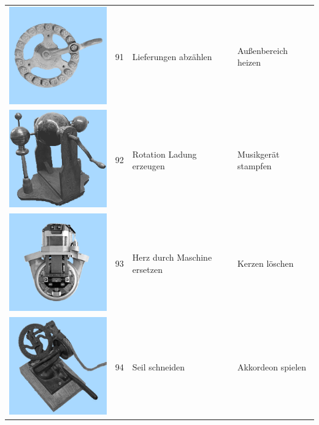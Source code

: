 \documentclass[
  english,
  man,floatsintext]{apa7}
\begin{document}
\begin{center}
\begin{ThreePartTable}
\begin{longtable}{llll}
\includegraphics[valign=c, scale=0.19]{../materials/unfamiliar/91.png} & 91 & Lieferungen abzählen & Außenbereich heizen\\
\includegraphics[valign=c, scale=0.19]{../materials/unfamiliar/92.png} & 92 & Rotation Ladung erzeugen & Musikgerät stampfen\\
\includegraphics[valign=c, scale=0.19]{../materials/unfamiliar/93.png} & 93 & Herz durch Maschine ersetzen & Kerzen löschen\\
\includegraphics[valign=c, scale=0.19]{../materials/unfamiliar/94.png} & 94 & Seil schneiden & Akkordeon spielen\\

\end{longtable}
\end{ThreePartTable}
\end{center}
\end{document}
